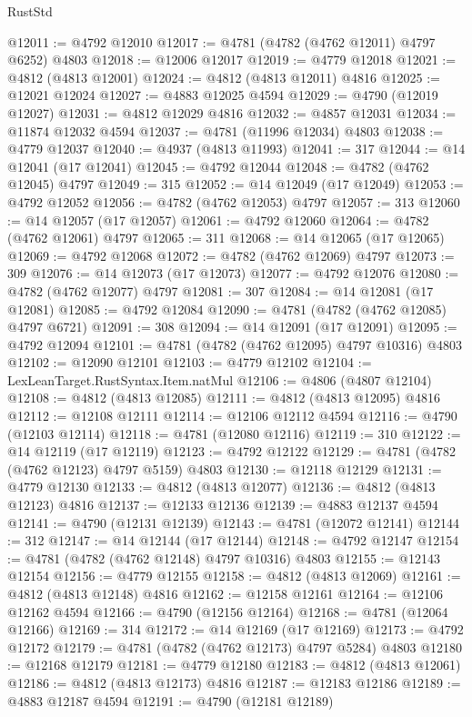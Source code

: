 \begin{lexlean}{RustStd}
\begin{coremodule}
@12011 := @4792 @12010
@12017 := @4781 (@4782 (@4762 @12011) @4797 @6252) @4803
@12018 := @12006 @12017
@12019 := @4779 @12018
@12021 := @4812 (@4813 @12001)
@12024 := @4812 (@4813 @12011) @4816
@12025 := @12021 @12024
@12027 := @4883 @12025 @4594
@12029 := @4790 (@12019 @12027)
@12031 := @4812 @12029 @4816
@12032 := @4857 @12031
@12034 := @11874 @12032 @4594
@12037 := @4781 (@11996 @12034) @4803
@12038 := @4779 @12037
@12040 := @4937 (@4813 @11993)
@12041 := 317
@12044 := @14 @12041 (@17 @12041)
@12045 := @4792 @12044
@12048 := @4782 (@4762 @12045) @4797
@12049 := 315
@12052 := @14 @12049 (@17 @12049)
@12053 := @4792 @12052
@12056 := @4782 (@4762 @12053) @4797
@12057 := 313
@12060 := @14 @12057 (@17 @12057)
@12061 := @4792 @12060
@12064 := @4782 (@4762 @12061) @4797
@12065 := 311
@12068 := @14 @12065 (@17 @12065)
@12069 := @4792 @12068
@12072 := @4782 (@4762 @12069) @4797
@12073 := 309
@12076 := @14 @12073 (@17 @12073)
@12077 := @4792 @12076
@12080 := @4782 (@4762 @12077) @4797
@12081 := 307
@12084 := @14 @12081 (@17 @12081)
@12085 := @4792 @12084
@12090 := @4781 (@4782 (@4762 @12085) @4797 @6721)
@12091 := 308
@12094 := @14 @12091 (@17 @12091)
@12095 := @4792 @12094
@12101 := @4781 (@4782 (@4762 @12095) @4797 @10316) @4803
@12102 := @12090 @12101
@12103 := @4779 @12102
@12104 := LexLeanTarget.RustSyntax.Item.natMul
@12106 := @4806 (@4807 @12104)
@12108 := @4812 (@4813 @12085)
@12111 := @4812 (@4813 @12095) @4816
@12112 := @12108 @12111
@12114 := @12106 @12112 @4594
@12116 := @4790 (@12103 @12114)
@12118 := @4781 (@12080 @12116)
@12119 := 310
@12122 := @14 @12119 (@17 @12119)
@12123 := @4792 @12122
@12129 := @4781 (@4782 (@4762 @12123) @4797 @5159) @4803
@12130 := @12118 @12129
@12131 := @4779 @12130
@12133 := @4812 (@4813 @12077)
@12136 := @4812 (@4813 @12123) @4816
@12137 := @12133 @12136
@12139 := @4883 @12137 @4594
@12141 := @4790 (@12131 @12139)
@12143 := @4781 (@12072 @12141)
@12144 := 312
@12147 := @14 @12144 (@17 @12144)
@12148 := @4792 @12147
@12154 := @4781 (@4782 (@4762 @12148) @4797 @10316) @4803
@12155 := @12143 @12154
@12156 := @4779 @12155
@12158 := @4812 (@4813 @12069)
@12161 := @4812 (@4813 @12148) @4816
@12162 := @12158 @12161
@12164 := @12106 @12162 @4594
@12166 := @4790 (@12156 @12164)
@12168 := @4781 (@12064 @12166)
@12169 := 314
@12172 := @14 @12169 (@17 @12169)
@12173 := @4792 @12172
@12179 := @4781 (@4782 (@4762 @12173) @4797 @5284) @4803
@12180 := @12168 @12179
@12181 := @4779 @12180
@12183 := @4812 (@4813 @12061)
@12186 := @4812 (@4813 @12173) @4816
@12187 := @12183 @12186
@12189 := @4883 @12187 @4594
@12191 := @4790 (@12181 @12189)

\end{coremodule}
\end{lexlean}
